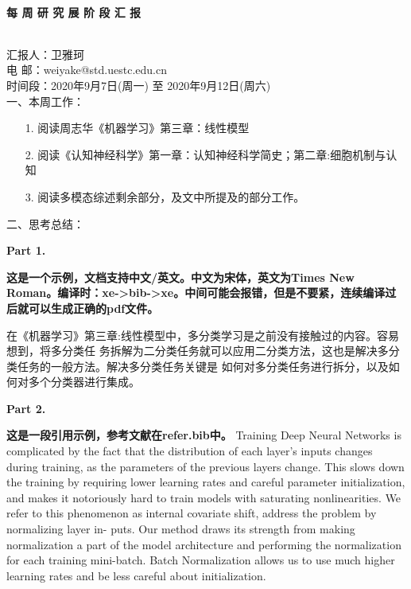 \documentclass[UTF8,10.5pt]{article} %
\begin{document}
~\\
\centerline{ \large \bf{每} \hspace{0.07cm} \bf{周}\hspace{0.07cm} \bf{研} \hspace{0.07cm}\bf{究} \hspace{0.07cm}\bf{展} \hspace{0.07cm}\bf{阶}\hspace{0.07cm} \bf{段}\hspace{0.07cm} \bf{汇} \hspace{0.07cm}\bf{报}}
~\\

\noindent 汇报人：卫雅珂 \\
\noindent 电\hspace{0.29cm} 邮：weiyake@std.uestc.edu.cn \\
\noindent 时间段：2020年9月7日(周一) 至 2020年9月12日(周六) \\

\noindent 一、本周工作：

\begin{enumerate}[labelsep = .5em, leftmargin = -18pt, itemindent = 3em]
    \item [1.] 阅读周志华《机器学习》第三章：线性模型      
    \item [2.] 阅读《认知神经科学》第一章：认知神经科学简史；第二章:细胞机制与认知
    \item [3.] 阅读多模态综述剩余部分，及文中所提及的部分工作。
\end{enumerate}
\vspace{0.3cm}

\noindent 二、思考总结：

\noindent \textbf{Part 1.} 

\textbf{这是一个示例，文档支持中文/英文。中文为宋体，英文为Times New Roman。编译时：xe->bib->xe。中间可能会报错，但是不要紧，连续编译过后就可以生成正确的pdf文件。}

在《机器学习》第三章:线性模型中，多分类学习是之前没有接触过的内容。容易想到，将多分类任 务拆解为二分类任务就可以应用二分类方法，这也是解决多分类任务的一般方法。解决多分类任务关键是 如何对多分类任务进行拆分，以及如何对多个分类器进行集成。

\vspace{0.5cm}
\noindent \textbf{Part 2.} 

\textbf{这是一段引用示例，参考文献在refer.bib中。}
Training Deep Neural Networks is complicated by the fact \cite{diesase2012improving,levey2020nomenclature,hobson2015cost} that the distribution of each layer’s inputs changes during training, as the parameters of the previous layers change. This\cite{levey2020nomenclature} slows down the training by requiring lower learning rates and careful parameter initialization, and makes it notoriously hard to train models with saturating nonlinearities. We refer to this\cite{hobson2015cost} phenomenon as internal covariate shift, address the problem by normalizing layer in- puts. Our method draws its strength from making normalization a part of the model architecture and performing the normalization for each training mini-batch. Batch Normalization allows us to use much higher learning rates and be less careful about initialization. 
\end{document}
